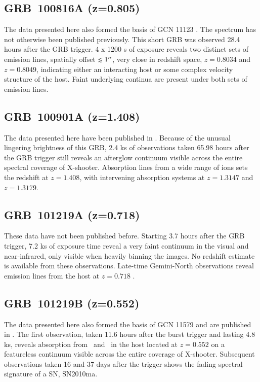 \documentclass[longauth]{aa}    %
\begin{document}
\subsection{GRB~100816A (z=0.805)} \label{100816}

The data presented here also formed the basis of GCN 11123 \citep{GCN11123}. The
spectrum has not otherwise been published previously. This short GRB was
observed 28.4 hours after the GRB trigger. 4 x 1200 s of exposure reveals two
distinct sets of emission lines, spatially offset $\lesssim 1 ^{\prime\prime} $, very
close in redshift space, $z=0.8034$ and $z=0.8049$, indicating either an
interacting host or some complex velocity structure of the host. Faint
underlying continua are present under both sets of emission lines.

\subsection{GRB~100901A (z=1.408)} \label{100901}

The data presented here have been published in \citet{Hartoog2013}. Because of
the unusual lingering brightness of this GRB, 2.4 ks of observations taken 65.98
hours after the GRB trigger still reveals an afterglow continuum visible across
the entire spectral coverage of X-shooter. Absorption lines from a wide range of
ions sets the redshift at $z=1.408$, with intervening absorption systems at $z =
1.3147$ and $z = 1.3179$.

\subsection{GRB~101219A (z=0.718)} \label{101219A}

These data have not been published before. Starting 3.7 hours after the GRB
trigger, 7.2 ks of exposure time reveal a very faint continuum in the visual and
near-infrared, only visible when heavily binning the images. No redshift
estimate is available from these observations.  Late-time Gemini-North
observations reveal emission lines from the host at $z=0.718$ \citep{GCN11518}.

\subsection{GRB~101219B (z=0.552)} \label{101219B}

The data presented here also formed the basis of GCN 11579 \citep{GCN11579} and
are published in \citet{Sparre2011}. The first observation, taken 11.6 hours
after the burst trigger and lasting 4.8 ks, reveals absorption from \mgii~and
\mgi~in the host located at $z = 0.552$ on a featureless continuum visible
across the entire coverage of X-shooter.  Subsequent observations taken 16 and
37 days after the trigger shows the fading spectral signature of a SN, SN2010ma.
\end{document}
